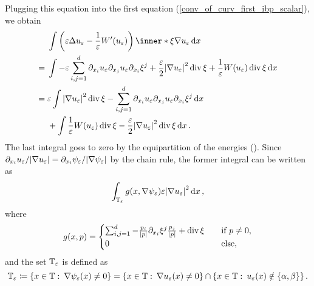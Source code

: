 Plugging this equation into the first equation (\ref{conv_of_curv_first_ibp_scalar}), we obtain
\begin{align}
	& \int
		\left(
			\varepsilon \Delta u_{ \varepsilon }
			-
			\frac{ 1 }{ \varepsilon }
			W'( u_{ \varepsilon } ) 
		\right)
		\inner*{ \xi }{ \nabla u_{ \varepsilon } }
	\dd{ x }
	\notag
	\\
	\label{curvature_term_equality_which_bounds}
	={} &
	\int
		-\varepsilon \sum_{ i, j = 1}^{ d }
			\partial_{ x_{ i } } u_{ \varepsilon }
			\partial_{ x_{ j } } u_{ \varepsilon }
			\partial_{ x_{ i } } \xi^{ j } 
		+
		\frac{ \varepsilon }{ 2 }
		\abs{ \nabla u_{ \varepsilon } }^{ 2 }
		\divg \xi 
		+
		\frac{ 1 }{ \varepsilon }
		W ( u_{ \varepsilon } ) 
		\divg \xi 
	\dd{ x }
	\\
	= {} &
	\varepsilon
	\int
		\abs{ \nabla u_{ \varepsilon } }^{ 2 }
		\divg \xi 
		-
		\sum_{ i, j = 1 }^{ d }
			\partial_{ x_{ i } } u_{ \varepsilon }
			\partial_{ x_{ j } } u_{ \varepsilon }
			\partial_{ x_{ i } } \xi^{ j }
	\dd{ x }
	\notag
	\\
	& + 
	\int
		\frac{ 1 }{ \varepsilon }
		W ( u_{ \varepsilon } )
		\divg \xi 
		-
		\frac{ \varepsilon }{ 2 }
		\abs{ \nabla u_{ \varepsilon } }^{ 2 }
		\divg \xi
	\dd{ x }
	\notag.
\end{align}
The last integral goes to zero by the equipartition of the energies ().
Since $ \partial_{ x_{ i } } u_{ \varepsilon } / \abs{ \nabla u_{ \varepsilon } } = \partial_{ x_{ i } } \psi_{ \varepsilon } / \abs{ \nabla \psi_{ \varepsilon  } } $ by the chain rule, the former integral can be written as
\begin{equation*}
	\label{conv_of_curv_scalar_written_as_g}
	\int_{ \operatorname{\mathbb{T}}_{ \varepsilon } }
		g ( x , \nabla \psi_{ \varepsilon } )
		\varepsilon \abs{ \nabla u_{ \varepsilon } }^{ 2 }
	\dd{ x },
\end{equation*}
where 
\begin{equation*}
	g ( x, p )
	=
	\begin{cases}
		\sum_{ i, j = 1}^{ d }
			-
			\frac{ p_{ i } }{ \abs{ p } }
			\partial_{ x_{ i } } \xi^{ j }
			\frac{ p_{ j } }{ \abs{ p } }
		+
		\operatorname{div} \xi 
		\quad
		&\text{if } p \neq 0,
		\\
		0
		&\text{else},
	\end{cases}
\end{equation*}
and the set $ \operatorname{\mathbb{T}}_{ \varepsilon } $ is defined as
\begin{equation*}
	\operatorname{\mathbb{T}}_{ \varepsilon }
	\coloneqq
	\left\{
		x \in \operatorname{\mathbb{T}}
		\, \colon \,
		\nabla \psi_{ \varepsilon } ( x ) \neq 0
	\right\}
	=
	\left\{
		x \in \operatorname{\mathbb{T}}
		\, \colon \,
		\nabla u_{ \varepsilon } ( x ) \neq 0 
	\right\}
	\cap
	\left\{
		x \in \operatorname{\mathbb{T}}
		\, \colon \,
		u_{ \varepsilon } ( x ) \notin \{ \alpha , \beta \}
	\right\}.
\end{equation*}
